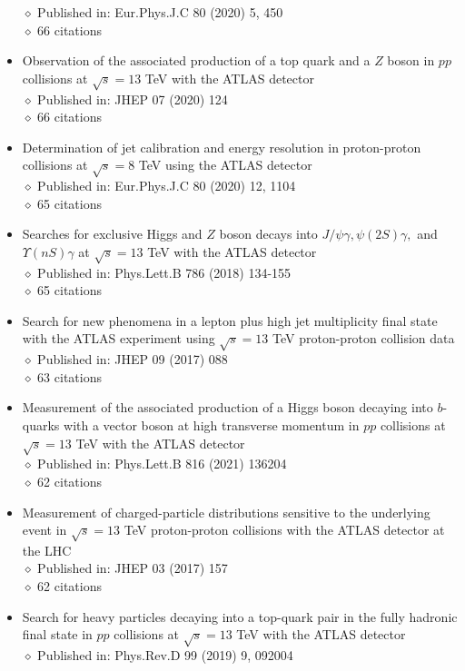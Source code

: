 \documentclass[margin, 10pt]{res} %
\begin{document}
\begin{resume}
\begin{itemize}
$\diamond$ Published in: Eur.Phys.J.C 80 (2020) 5, 450\\
$\diamond$ 66 citations
\item Observation of the associated production of a top quark and a $Z$ boson in $pp$ collisions at $\sqrt{s} = 13$ TeV with the ATLAS detector\\
$\diamond$ Published in: JHEP 07 (2020) 124\\
$\diamond$ 66 citations
\item Determination of jet calibration and energy resolution in proton-proton collisions at $\sqrt{s} = 8$ TeV using the ATLAS detector\\
$\diamond$ Published in: Eur.Phys.J.C 80 (2020) 12, 1104\\
$\diamond$ 65 citations
\item Searches for exclusive Higgs and $Z$ boson decays into $J/\psi\gamma, \psi(2S)\gamma,$ and $\Upsilon(nS)\gamma$ at $\sqrt{s} = 13$ TeV with the ATLAS detector\\
$\diamond$ Published in: Phys.Lett.B 786 (2018) 134-155\\
$\diamond$ 65 citations
\item Search for new phenomena in a lepton plus high jet multiplicity final state with the ATLAS experiment using $\sqrt{s} = 13$ TeV proton-proton collision data\\
$\diamond$ Published in: JHEP 09 (2017) 088\\
$\diamond$ 63 citations
\item Measurement of the associated production of a Higgs boson decaying into $b$-quarks with a vector boson at high transverse momentum in $pp$ collisions at $\sqrt{s} = 13$ TeV with the ATLAS detector\\
$\diamond$ Published in: Phys.Lett.B 816 (2021) 136204\\
$\diamond$ 62 citations
\item Measurement of charged-particle distributions sensitive to the underlying event in $\sqrt{s} = 13$ TeV proton-proton collisions with the ATLAS detector at the LHC\\
$\diamond$ Published in: JHEP 03 (2017) 157\\
$\diamond$ 62 citations
\item Search for heavy particles decaying into a top-quark pair in the fully hadronic final state in $pp$ collisions at $\sqrt{s} = 13$ TeV with the ATLAS detector\\
$\diamond$ Published in: Phys.Rev.D 99 (2019) 9, 092004\\

\end{itemize}
\end{resume}
\end{document}
